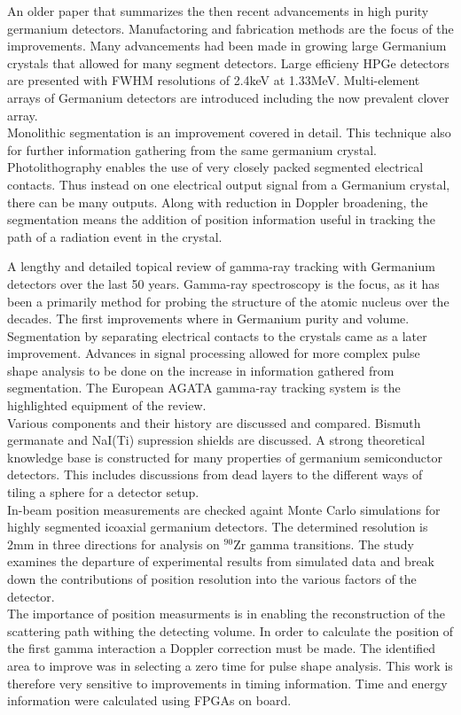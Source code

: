 \documentclass[12pt]{article}
\begin{document}
An older paper that summarizes the then recent advancements in high purity germanium detectors. Manufactoring and fabrication methods are the focus of the improvements. Many advancements had been made in growing large Germanium crystals that allowed for many segment detectors. Large efficieny HPGe detectors are presented with FWHM resolutions of 2.4keV at 1.33MeV. Multi-element arrays of Germanium detectors are introduced including the now prevalent clover array.
\\
Monolithic segmentation is an improvement covered in detail. This technique also for further information gathering from the same germanium crystal. Photolithography enables the use of very closely packed segmented electrical contacts. Thus instead on one electrical output signal from a Germanium crystal, there can be many outputs. Along with reduction in Doppler broadening, the segmentation means the addition of position information useful in tracking the path of a radiation event in the crystal.
\\[20pt]


{\large\textbf{\cite{Eberth2008283}}}

A lengthy and detailed topical review of gamma-ray tracking with Germanium detectors over the last 50 years. Gamma-ray spectroscopy is the focus, as it has been a primarily method for probing the structure of the atomic nucleus over the decades. The first improvements where in Germanium purity and volume. Segmentation by separating electrical contacts to the crystals came as a later improvement. Advances in signal processing allowed for more complex pulse shape analysis to be done on the increase in information gathered from segmentation. The European AGATA gamma-ray tracking system is the highlighted equipment of the review.
\\
Various components and their history are discussed and compared. Bismuth germanate and NaI(Ti) supression shields are discussed. A strong theoretical knowledge base is constructed for many properties of germanium semiconductor detectors. This includes discussions from dead layers to the different ways of tiling a sphere for a detector setup.
\\[20pt]


{\large\textbf{\cite{Descovich2005535}}}
In-beam position measurements are checked againt Monte Carlo simulations for highly segmented icoaxial germanium detectors. The determined resolution is 2mm in three directions for analysis on $^{90}\mbox{Zr}$ gamma transitions. The study examines the departure of experimental results from simulated data and break down the contributions of position resolution into the various factors of the detector.
\\
The importance of position measurments is in enabling the reconstruction of the scattering path withing the detecting volume. In order to calculate the position of the first gamma interaction a Doppler correction must be made. The identified area to improve was in selecting a zero time for pulse shape analysis. This work is therefore very sensitive to improvements in timing information. Time and energy information were calculated using FPGAs on board.
\\[20pt]
\end{document}

